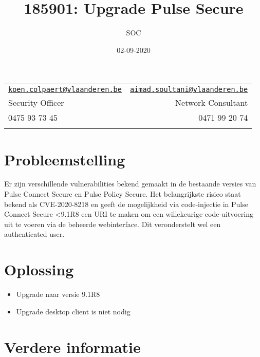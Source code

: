 \documentclass[11pt,]{article}
\title{185901: Upgrade Pulse Secure}
\author{SOC}
\date{02-09-2020}
\begin{document}
  

		\maketitle
		
	
		\thispagestyle{firststyle}



	\noindent \begin{tabular*}{\textwidth}{ @{\extracolsep{\fill}} lr @{\extracolsep{\fill}}}


\texttt{\href{mailto:koen.colpaert@vlaanderen.be}{\nolinkurl{koen.colpaert@vlaanderen.be}}} & \texttt{\href{mailto:aimad.soultani@vlaanderen.be}{\nolinkurl{aimad.soultani@vlaanderen.be}}}\\
Security Officer  &  Network Consultant\\
0475 93 73 45  & 0471 99 20 74 \\
	&  \\
	\hline
	\end{tabular*}
	
\vspace{2mm}
	


\hypertarget{Probleemstelling}{%
\section{Probleemstelling}\label{Probleemstelling}}

Er zijn verschillende vulnerabilities bekend gemaakt in de bestaande versies van Pulse Connect Secure en Pulse Policy Secure. Het belangrijkste risico staat bekend als CVE-2020-8218 en geeft de mogelijkheid via code-injectie in Pulse Connect Secure <9.1R8 een URI te maken om een willekeurige code-uitvoering uit te voeren via de beheerde webinterface. Dit veronderstelt wel een authenticated user.   

\hypertarget{Oplossing}{%
\section{Oplossing}\label{Oplossing}}

\begin{itemize}
\item Upgrade naar versie 9.1R8
\item Upgrade desktop client is niet nodig
\end{itemize}

\hypertarget{Verdere informatie}{%
\section{Verdere informatie}\label{Verdere informatie}}
\end{document}
